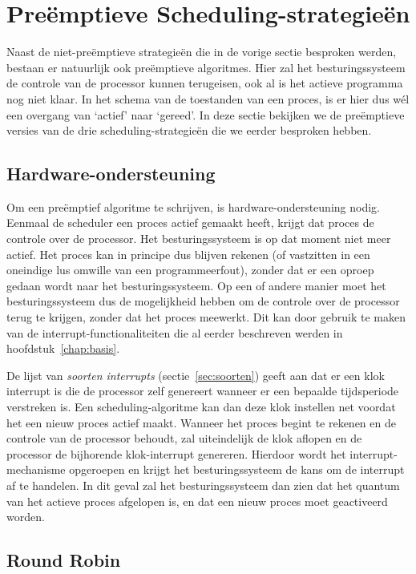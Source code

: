 \section{Pre\"emptieve Scheduling-strategie\"en}

Naast de niet-pre\"emptieve strategie\"en die in de vorige sectie besproken werden, bestaan er natuurlijk ook pre\"emptieve algoritmes. Hier zal het besturingssysteem de controle van de processor kunnen terugeisen, ook al is het actieve programma nog niet klaar. In het schema van de toestanden van een proces, is er hier dus w\'el een overgang van `actief' naar `gereed'. In deze sectie bekijken we de pre\"emptieve versies van de drie scheduling-strategie\"en die we eerder besproken hebben.

\subsection{Hardware-ondersteuning}

Om een pre\"emptief algoritme te schrijven, is hardware-ondersteuning nodig. Eenmaal de scheduler een proces actief gemaakt heeft, krijgt dat proces de controle over de processor. Het besturingssysteem is op dat moment niet meer actief. Het proces kan in principe dus blijven rekenen (of vastzitten in een oneindige lus omwille van een programmeerfout), zonder dat er een oproep gedaan wordt naar het besturingssysteem. Op een of andere manier moet het besturingssysteem dus de mogelijkheid hebben om de controle over de processor terug te krijgen, zonder dat het proces meewerkt. Dit kan door gebruik te maken van de interrupt-functionaliteiten die al eerder beschreven werden in hoofdstuk~\ref{chap:basis}.

De lijst van \emph{soorten interrupts} (sectie~\ref{sec:soorten}) geeft aan dat er een klok interrupt is die de processor zelf genereert wanneer er een bepaalde tijdsperiode verstreken is. Een scheduling-algoritme kan dan deze klok instellen net voordat het een nieuw proces actief maakt. Wanneer het proces begint te rekenen en de controle van de processor behoudt, zal uiteindelijk de klok aflopen en de processor de bijhorende klok-interrupt genereren. Hierdoor wordt het interrupt-mechanisme opgeroepen en krijgt het besturingssysteem de kans om de interrupt af te handelen. In dit geval zal het besturingssysteem dan zien dat het quantum van het actieve proces afgelopen is, en dat een nieuw proces moet geactiveerd worden.

\subsection{Round Robin}

